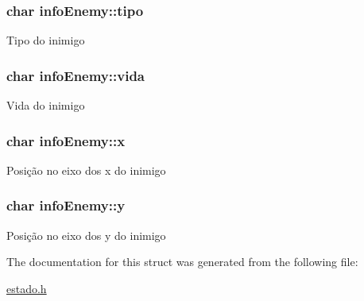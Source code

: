 \subsubsection[{\texorpdfstring{tipo}{tipo}}]{\setlength{\rightskip}{0pt plus 5cm}char info\+Enemy\+::tipo}\hypertarget{structinfoEnemy_a0a778048d7b2d14d11f0342e27d89528}{}\label{structinfoEnemy_a0a778048d7b2d14d11f0342e27d89528}
Tipo do inimigo 
\subsubsection[{\texorpdfstring{vida}{vida}}]{\setlength{\rightskip}{0pt plus 5cm}char info\+Enemy\+::vida}\hypertarget{structinfoEnemy_a8905a46eaf64781c4a9138754ff170cc}{}\label{structinfoEnemy_a8905a46eaf64781c4a9138754ff170cc}
Vida do inimigo 
\subsubsection[{\texorpdfstring{x}{x}}]{\setlength{\rightskip}{0pt plus 5cm}char info\+Enemy\+::x}\hypertarget{structinfoEnemy_a20155b918f06fb0d4fef4cc5ed8705df}{}\label{structinfoEnemy_a20155b918f06fb0d4fef4cc5ed8705df}
Posição no eixo dos x do inimigo 
\subsubsection[{\texorpdfstring{y}{y}}]{\setlength{\rightskip}{0pt plus 5cm}char info\+Enemy\+::y}\hypertarget{structinfoEnemy_a89534bd4f2115fcbf522e82879dfb8eb}{}\label{structinfoEnemy_a89534bd4f2115fcbf522e82879dfb8eb}
Posição no eixo dos y do inimigo 

The documentation for this struct was generated from the following file\+:\begin{DoxyCompactItemize}
\item 
\hyperlink{estado_8h}{estado.\+h}\end{DoxyCompactItemize}
